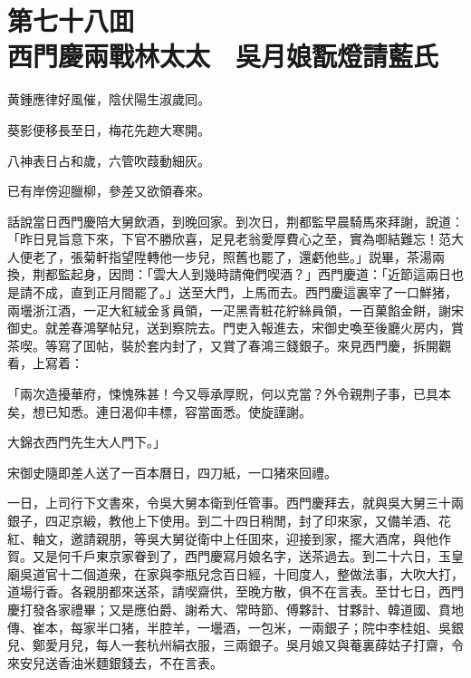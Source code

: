 
\chapter*{第七十八囬　\\西門慶兩戰林太太　吳月娘翫燈請藍氏}


\begin{myquote}
黄鍾應律好風催，陰伏陽生淑歲囘。

葵影便移長至日，梅花先趂大寒開。

八神表日占和歲，六管吹葭動細灰。

已有岸傍迎臘柳，參差又欲領春來。
\end{myquote}

話說當日西門慶陪大舅飲酒，到晚回家。到次日，荆都監早晨騎馬來拜謝，說道：「昨日見旨意下來，下官不勝欣喜，足見老翁愛厚費心之至，實為啣結難忘！范大人便老了，張菊軒指望陞轉他一步兒，照舊也罷了，還虧他些。」説畢，茶湯兩換，荆都監起身，因問：「雲大人到幾時請俺們喫酒？」西門慶道：「近節這兩日也是請不成，直到正月間罷了。」送至大門，上馬而去。西門慶這裏宰了一口鮮猪，兩壜浙江酒，一疋大紅絨金豸員領，一疋黑青粧花紵絲員領，一百菓餡金餅，謝宋御史。就差春鴻拏帖兒，送到察院去。門吏入報進去，宋御史喚至後廳火房内，賞茶喫。等寫了囬帖，裝於套内封了，又賞了春鴻三錢銀子。來見西門慶，拆開觀看，上寫着：

\begin{myquote}[\markfont]
「兩次造擾華府，悚愧殊甚！今又辱承厚貺，何以克當？外令親荆子事，已具本矣，想已知悉。連日渴仰丰標，容當面悉。使旋謹謝。


\raggedright{大錦衣西門先生大人門下。」}
\end{myquote}

宋御史隨即差人送了一百本曆日，四刀紙，一口猪來回禮。

一日，上司行下文書來，令吳大舅本衛到任管事。西門慶拜去，就與吳大舅三十兩銀子，四疋京緞，教他上下使用。到二十四日稍閒，封了印來家，又備羊酒、花紅、軸文，邀請親朋，等吳大舅従衛中上任囬來，迎接到家，擺大酒席，與他作賀。又是何千戶東京家眷到了，西門慶寫月娘名字，送茶過去。到二十六日，玉皇廟吳道官十二個道衆，在家與李瓶兒念百日經，十囘度人，整做法事，大吹大打，道場行香。各親朋都來送茶，請喫齋供，至晚方散，俱不在言表。至廿七日，西門慶打發各家禮畢；又是應伯爵、謝希大、常時節、傅夥計、甘夥計、韓道國、賁地傳、崔本，每家半口猪，半腔羊，一壜酒，一包米，一兩銀子；院中李桂姐、吳銀兒、鄭愛月兒，每人一套杭州絹衣服，三兩銀子。吳月娘又與菴裏薛姑子打齋，令來安兒送香油米麵銀錢去，不在言表。

